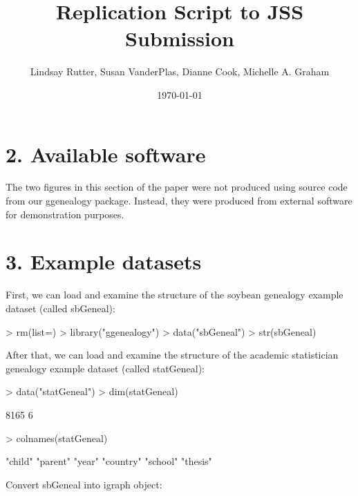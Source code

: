 \documentclass{article}
\title{Replication Script to JSS Submission}
\begin{document}
\author{Lindsay Rutter, Susan VanderPlas, Dianne Cook, Michelle A. Graham}
\date{\today}
\maketitle

\tableofcontents

\section*{2. Available software}

The two figures in this section of the paper were not produced using source code from our ggenealogy package. Instead, they were produced from external software for demonstration purposes.

\section*{3. Example datasets}

First, we can load and examine the structure of the soybean genealogy example dataset (called sbGeneal):

\begin{Schunk}
\begin{Sinput}
> rm(list=)
> library("ggenealogy")
> data("sbGeneal")
> str(sbGeneal)
\end{Sinput}
\end{Schunk}

After that, we can load and examine the structure of the academic statistician genealogy example dataset (called statGeneal):

\begin{Schunk}
\begin{Sinput}
> data("statGeneal")
> dim(statGeneal)
\end{Sinput}
\begin{Soutput}
[1] 8165    6
\end{Soutput}
\begin{Sinput}
> colnames(statGeneal)
\end{Sinput}
\begin{Soutput}
[1] "child"   "parent"  "year"    "country" "school"  "thesis" 
\end{Soutput}
\end{Schunk}

Convert sbGeneal into igraph object:
\end{document}
